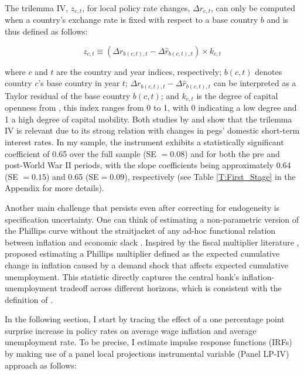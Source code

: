 \documentclass[12pt]{article}
\begin{document}
The trilemma IV, $z_{c,t}$, for local policy rate changes, $\Delta r_{c,t}$, can only be computed when a country's exchange rate is fixed with respect to a base country $b$ and is thus defined as follows:

\begin{equation} \label{EQ:trilemmaIV}
	z_{c,t} \equiv (\Delta r_{b(c,t),t} - \Delta \hat{r}_{b(c,t),t}) \times k_{c,t}
\end{equation}

where $c$ and $t$ are the country and year indices, respectively; $b(c,t)$ denotes country $c$'s base country in year $t$; $\Delta r_{b(c,t),t} - \Delta \hat{r}_{b(c,t),t}$ can be interpreted as a Taylor residual of the base country $b(c,t)$; and $k_{c,t}$ is the degree of capital openness from \cite{Quinn2011}, this index ranges from 0 to 1, with 0 indicating a low degree and 1 a high degree of capital mobility. Both studies by \cite{Jorda2019} and \cite{Schularick2020} show that the trilemma IV is relevant due to its strong relation with changes in pegs' domestic short-term interest rates. In my sample, the instrument exhibits a statistically significant coefficient of 0.65 over the full sample (SE $=0.08$) and for both the pre and post-World War II periods, with the slope coefficients being approximately 0.64 (SE $=0.15$) and 0.65 (SE$=0.09$), respectively (see Table \ref{T:First_Stage} in the Appendix for more details).

Another main challenge that persists even after correcting for endogeneity is specification uncertainty. One can think of estimating a non-parametric version of the Phillips curve without the straitjacket of any ad-hoc functional relation between inflation and economic slack \citep{Gali2019}. Inspired by the fiscal multiplier literature \citep{Ramey2018}, \cite{Barnichon2019} proposed estimating a Phillips multiplier defined as the expected cumulative change in inflation caused by a demand shock that affects expected cumulative unemployment. This statistic directly captures the central bank's inflation-unemployment tradeoff across different horizons, which is consistent with the definition of \cite{Mankiw2001}.

In the following section, I start by tracing the effect of a one percentage point surprise increase in policy rates on average wage inflation and average unemployment rate. To be precise, I estimate impulse response functions (IRFs) by making use of a panel local projections instrumental variable (Panel LP-IV) approach \citep{Jorda2005, Stock2018} as follows:
\end{document}
